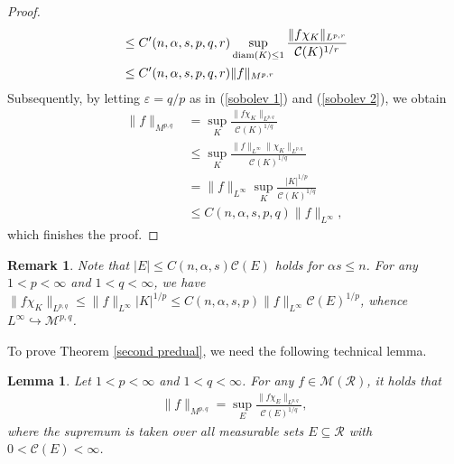 \documentclass[10pt,reqno]{amsart}
\newtheorem{lemma}[theorem]{Lemma}
\newtheorem{remark}[theorem]{Remark}
\numberwithin{equation}{section}
\begin{document}
\begin{proof}
\begin{align*}
&\leq C'(n,\alpha,s,p,q,r)\sup_{{\rm diam}(K)\leq 1}\frac{\|f\chi_{K}\|_{L^{p,r}}}{\mathcal{C}(K)^{1/r}}\\
&\leq C'(n,\alpha,s,p,q,r)\|f\|_{M^{p,r}}
\end{align*}
Subsequently, by letting $\varepsilon=q/p$ as in (\ref{sobolev 1}) and (\ref{sobolev 2}), we obtain
\begin{align*}
\|f\|_{M^{p,q}}&=\sup_{K}\frac{\|f\chi_{K}\|_{L^{p,q}}}{\mathcal{C}(K)^{1/q}}\\
&\leq\sup_{K}\frac{\|f\|_{L^{\infty}}\|\chi_{K}\|_{L^{p,q}}}{\mathcal{C}(K)^{1/q}}\\
&=\|f\|_{L^{\infty}}\sup_{K}\frac{|K|^{1/p}}{\mathcal{C}(K)^{1/q}}\\
&\leq C(n,\alpha,s,p,q)\|f\|_{L^{\infty}},
\end{align*}
which finishes the proof.
\end{proof}

\begin{remark}
\rm Note that $|E|\leq C(n,\alpha,s)\mathcal{C}(E)$ holds for $\alpha s\leq n$. For any $1<p<\infty$ and $1<q<\infty$, we have $\|f\chi_{K}\|_{L^{p,q}}\leq\|f\|_{L^{\infty}}|K|^{1/p}\leq C(n,\alpha,s,p)\|f\|_{L^{\infty}}\mathcal{C}(E)^{1/p}$, whence $L^{\infty}\hookrightarrow\mathcal{M}^{p,q}$.
\end{remark}

To prove Theorem \ref{second predual}, we need the following technical lemma.
\begin{lemma}\label{norm switching}
Let $1<p<\infty$ and $1<q<\infty$. For any $f\in\mathcal{M}(\mathcal{R})$, it holds that
\begin{align*}
\|f\|_{M^{p,q}}=\sup_{E}\frac{\|f\chi_{E}\|_{L^{p,q}}}{\mathcal{C}(E)^{1/q}},
\end{align*}
where the supremum is taken over all measurable sets $E\subseteq\mathcal{R}$ with $0<\mathcal{C}(E)<\infty$.
\end{lemma}
\end{document}
